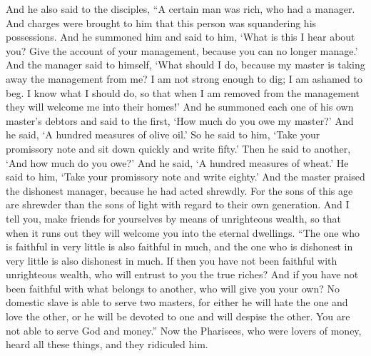 \begin{biblechapter} %
 And he also said to the disciples, “A certain man was rich, who had a manager. And charges were brought to him that this person was squandering his possessions.
\verse And he summoned him and said to him, ‘What is this I hear about you? Give the account of your management, because you can no longer manage.’
\verse And the manager said to himself, ‘What should I do, because my master is taking away the management from me? I am not strong enough to dig; I am ashamed to beg.
\verse I know what I should do, so that when I am removed from the management they will welcome me into their homes!’
\verse And he summoned each one of his own master’s debtors and said to the first, ‘How much do you owe my master?’
\verse And he said, ‘A hundred measures of olive oil.’ So he said to him, ‘Take your promissory note and sit down quickly and write fifty.’
\verse Then he said to another, ‘And how much do you owe?’ And he said, ‘A hundred measures of wheat.’ He said to him, ‘Take your promissory note and write eighty.’
\verse And the master praised the dishonest manager, because he had acted shrewdly. For the sons of this age are shrewder than the sons of light with regard to their own generation.
\verse And I tell you, make friends for yourselves by means of unrighteous wealth, so that when it runs out they will welcome you into the eternal dwellings.
\verse “The one who is faithful in very little is also faithful in much, and the one who is dishonest in very little is also dishonest in much.
\verse If then you have not been faithful with unrighteous wealth, who will entrust to you the true riches?
\verse And if you have not been faithful with what belongs to another, who will give you your own?
\verse No domestic slave is able to serve two masters, for either he will hate the one and love the other, or he will be devoted to one and will despise the other. You are not able to serve God and money.”
 Now the Pharisees, who were lovers of money, heard all these things, and they ridiculed him.

\end{biblechapter}
